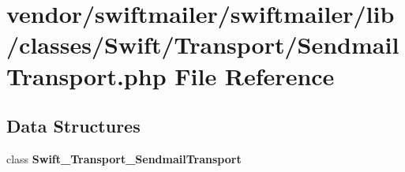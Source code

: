 \section{vendor/swiftmailer/swiftmailer/lib/classes/\+Swift/\+Transport/\+Sendmail\+Transport.php File Reference}
\label{_transport_2_sendmail_transport_8php}
\subsection*{Data Structures}
\begin{DoxyCompactItemize}
\item 
class {\bf Swift\+\_\+\+Transport\+\_\+\+Sendmail\+Transport}
\end{DoxyCompactItemize}
